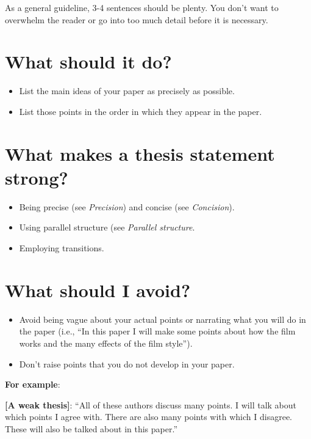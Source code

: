 As a general guideline, 3-4 sentences should be plenty. You don't want to overwhelm the reader or go into too much detail before it is necessary.

\section{What should it do?}

\begin{itemize}
\item List the main ideas of your paper as precisely as possible.

\item List those points in the order in which they appear in the paper.

\end{itemize}

\section{What makes a thesis statement strong?}

\begin{itemize}
\item Being precise (see \emph{Precision}) and concise (see \emph{Concision}).

\item Using parallel structure (see \emph{Parallel structure}.

\item Employing transitions.
\end{itemize}

\section{What should I avoid?}

\begin{itemize}
\item Avoid being vague about your actual points or narrating what you will do in the paper (i.e., ``In this paper I will make some points about how the film works and the many effects of the film style'').

\item Don't raise points that you do not develop in your paper.

\end{itemize}

\textbf{For example}:

\textbf{[A weak thesis]}:  “All of these authors discuss many points. I will talk about which points I agree with. There are also many points with which I disagree. These will also be talked about in this paper.”


